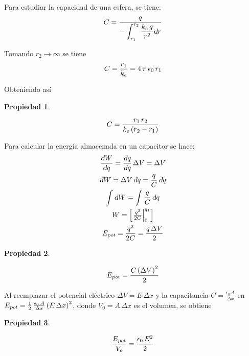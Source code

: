 \documentclass[a5paper,12pt,twoside]{book}
\newtheorem{prop}{{Propiedad}}[chapter]
\begin{document}
Para estudiar la capacidad de una esfera, se tiene:
\begin{equation*}
    C = \frac{q}{-\displaystyle\int_{r_1}^{r_2} \frac{k_e \, q}{r^2} \textsl{d} r}
\end{equation*}

Tomando $r_2 \to \infty$ se tiene
\begin{equation*}
    C = \frac{r_1}{k_e} = 4 \, \pi \, \epsilon_0 \, r_1
\end{equation*}

Obteniendo así

\begin{mdframed}[style=MyFrame1]
    \begin{prop}
    \end{prop}
    \begin{equation*}
        C = \frac{r_1 \, r_2}{k_e \left(r_2 - r_1\right)}
    \end{equation*}
\end{mdframed}

Para calcular la energía almacenada en un capacitor se hace:
\begin{gather*}
    \frac{\textsl{d} W}{\textsl{d} q} = \frac{\textsl{d} q}{\textsl{d} q} \, \Delta V = \Delta V
    \\
    \textsl{d} W = \Delta V \, \textsl{d} q = \frac{q}{C} \, \textsl{d} q
    \\
    \int \textsl{d} W = \int \frac{q}{C} \, \textsl{d} q
    \\
    W = \begin{bmatrix} \left. \frac{q^2}{2C} \right|_{0}^{q_1} \end{bmatrix}
    \\
    {{E}_\textsl{{pot}}} = \frac{q^2}{2C} = \frac{q \, \Delta V}{2}
\end{gather*}

\begin{mdframed}[style=MyFrame1]
    \begin{prop}
    \end{prop}
    \begin{equation*}
        {{E}_\textsl{{pot}}} = \frac{C \left(\Delta V\right)^2}{2}
    \end{equation*}
\end{mdframed}

Al reemplazar el potencial eléctrico $\Delta V = E \, \Delta x$ y la capacitancia $C = \tfrac{\epsilon_0 \, A}{\Delta x}$ en ${{E}_\textsl{{pot}}} = \tfrac{1}{2} \, \tfrac{\epsilon_0 \, A}{\Delta x} \left(E \, \Delta x\right)^2$, donde $V_0 = A \, \Delta x$ es el volumen, se obtiene

\begin{mdframed}[style=MyFrame1]
    \begin{prop}
    \end{prop}
    \begin{equation*}
        \dfrac{{{E}_\textsl{{pot}}}}{V_o} = \frac{\epsilon_0 \, E^2}{2}
    \end{equation*}
\end{mdframed}
\end{document}
